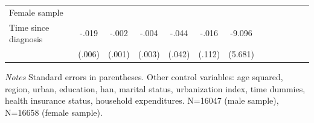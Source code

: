 \begin{table}[!ht]
\begin{adjustbox}{max width=\linewidth}
\begin{threeparttable}
{\begin{tabular}{l*{6}{S
S}}
Female sample &&&&&&\\
Time since diagnosis&  -.019\sym{***}&    -.002         &    -.004         &    -.044         &    -.016         &   -9.096         \\
                &   (.006)         &   (.001)         &   (.003)         &   (.042)         &   (.112)         &  (5.681)         \\          
\bottomrule
\end{tabular}
\begin{tablenotes}
\item \textit{Notes}   Standard errors in parentheses.
Other control variables: age squared, region, urban, education, han, marital status, urbanization index, time dummies, health insurance status, household expenditures. N=16047 (male sample), N=16658 (female sample).
\end{tablenotes}
}
\end{threeparttable}
\end{adjustbox}
\end{table}

\clearpage

